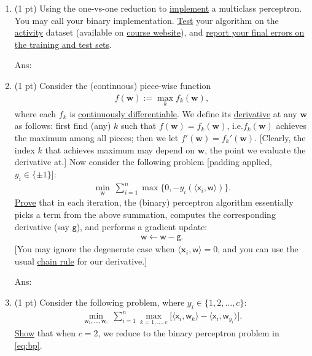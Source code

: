 \documentclass[10pt,letter,notitlepage]{article}
\newcommand{\wv}{\mathbf{w}}
\newcommand{\xv}{\mathbf{x}}
\newcommand{\inner}[2]{\langle #1, #2 \rangle}
\newcommand{\red}[1]{{\color{red}#1}}
\newcommand{\xbs}{\bm{\mathsf{x}}}
\newcommand{\wbs}{\bm{\mathsf{w}}}
\newcommand{\gbs}{\bm{\mathsf{g}}}
\newcommand{\ie}{{i.e.}\xspace}
\newcommand{\ans}[1]{{\color{orange}\textsf{Ans}: #1}}
\begin{document}
\begin{exercise}
\begin{enumerate}
	\ans{ 
	\vskip2cm
	}
		
	\item (1 pt) Using the one-vs-one reduction to \uline{implement} a multiclass perceptron. You may call your binary implementation. \uline{Test} your algorithm on the \href{https://archive-beta.ics.uci.edu/ml/datasets/human+activity+recognition+using+smartphoness}{activity} dataset (available on \href{https://cs.uwaterloo.ca/~y328yu/mycourses/480/assignment.html}{course website}), and \uline{report your final errors on the training and test sets}. 
	
	\ans{\vskip1cm
	}	
		
	\item (1 pt) Consider the (continuous) piece-wise function 
	\begin{align}
	f(\wv) := \max_k f_k(\wv),
	\end{align}
	where each $f_k$ is \href{https://en.wikipedia.org/wiki/Differentiable_function}{continuously differentiable}. 
	We define its \href{https://en.wikipedia.org/wiki/Subderivative}{derivative} at any $\wv$ as follows: first find (any) $k$ such that $f(\wv) = f_k(\wv)$, \ie $f_k(\wv)$ achieves the maximum among all pieces; then we let $f'(\wv) = f_k'(\wv)$. [Clearly, the index $k$ that achieves maximum may depend on $\wv$, the point we evaluate the derivative at.] Now consider the following problem [padding applied, $y_i \in \{\pm1\}$]: 
	\begin{align}
	\label{eq:bp}
	\min_{\wbs} ~ \sum_{i=1}^n \max\{ 0, -y_i (\inner{\xbs_i}{\wbs}) \}.
	\end{align}
	\uline{Prove} that in each iteration, the (binary) perceptron algorithm essentially picks a term from the above summation, computes the corresponding derivative (say $\gbs$), and performs a gradient update: 
	\begin{align}
	\wbs \gets \wbs - \gbs.
	\end{align}
	[You may ignore the degenerate case when $\inner{\xv_i}{\wbs} = 0$, and you can use  the usual \href{https://en.wikipedia.org/wiki/Chain_rule}{chain rule} for our derivative.]
	
	\ans{ 
	\vskip6cm
	}	

	\item (1 pt) Consider the following problem, where \red{$y_i \in \{1, 2, \ldots, c\}$}:
	\begin{align}
		\label{eq:mp}
		\min_{\wbs_1, \ldots, \wbs_c} ~ \sum_{i=1}^n \max_{k=1,\ldots, c} \Big [\inner{\xbs_i}{\wbs_k} - \inner{\xbs_i}{\wbs_{y_i}} \Big].
	\end{align}
	\uline{Show} that when $c=2$, we reduce to the binary perceptron problem in \eqref{eq:bp}.
	

\end{enumerate}
\end{exercise}
\end{document}
